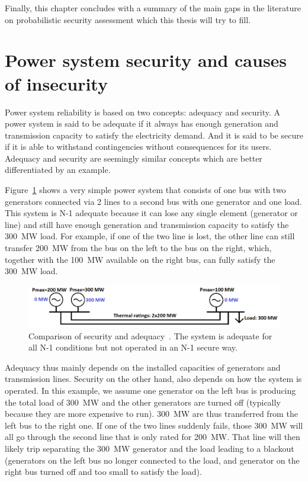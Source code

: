 Finally, this chapter concludes with a summary of the main gaps in the literature on probabilistic security assessment which this thesis will try to fill.



\section{Power system security and causes of insecurity}
\label{sec:Security_and_threats}

Power system reliability is based on two concepts: adequacy and security. A power system is said to be adequate if it always has enough generation and transmission capacity to satisfy the electricity demand. And it is said to be secure if it is able to withstand contingencies without consequences for its users. Adequacy and security are seemingly similar concepts which are better differentiated by an example.

Figure~\ref{fig:security_vs_adequacy} shows a very simple power system that consists of one bus with two generators connected via 2 lines to a second bus with one generator and one load. This system is N-1 adequate because it can lose any single element (generator or line) and still have enough generation and transmission capacity to satisfy the 300~MW load. For example, if one of the two line is lost, the other line can still transfer 200~MW from the bus on the left to the bus on the right, which, together with the 100~MW available on the right bus, can fully satisfy the 300~MW load.

\begin{figure}[h]
    \centering
    \includegraphics[width=\linewidth]{Figs/Security_vs_adequacy.png}
    \caption{Comparison of security and adequacy~\cite{ref}. The system is adequate for all N-1 conditions but not operated in an N-1 secure way.}
    \label{fig:security_vs_adequacy}
\end{figure}

Adequacy thus mainly depends on the installed capacities of generators and transmission lines. Security on the other hand, also depends on how the system is operated. In this example, we assume one generator on the left bus is producing the total load of 300~MW and the other generators are turned off (typically because they are more expensive to run). 300~MW are thus transferred from the left bus to the right one. If one of the two lines suddenly fails, those 300~MW will all go through the second line that is only rated for 200~MW. That line will then likely trip separating the 300~MW generator and the load leading to a blackout (generators on the left bus no longer connected to the load, and generator on the right bus turned off and too small to satisfy the load).

